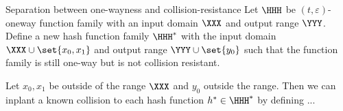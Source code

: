 \documentclass{crypto-exercise}
\author{Sven Laur}
\begin{document}
\begin{exercise}{Separation between one-wayness and collision-resistance}
Let $\HHH$ be $(t,\varepsilon)$-oneway function family with an input domain $\XXX$ and output range $\YYY$.
Define a new hash function family $\HHH^*$ with the input domain $\XXX\cup\set{x_0,x_1}$ and output range $\YYY\cup\set{y_0}$ such that the function family is still one-way but is not collision resistant. 
\end{exercise}
\begin{solution} 
Let $x_0, x_1$ be outside of the range $\XXX$ and $y_0$ outside the range. Then we can inplant a known collision to each hash function $h^*\in\HHH^*$ by defining ...



\end{solution}
\end{document}
